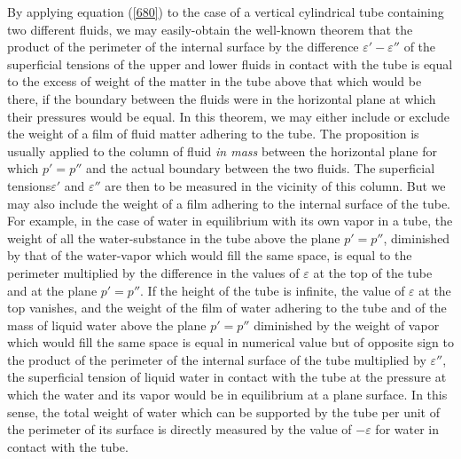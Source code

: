 \documentclass[12pt]{article}
\begin{document}
By applying equation (\ref{680}) to the case of a vertical cylindrical tube containing two different fluids, we may easily-obtain the well-known theorem that the product of the perimeter of the internal surface by the difference $\varepsilon' - \varepsilon''$ of the superficial tensions of the upper and lower fluids in contact with the tube is equal to the excess of weight of the matter in the tube above that which would be there, if the boundary between the fluids were in the horizontal plane at which their pressures would be equal. In this theorem, we may either include or exclude the weight of a film of fluid matter adhering to the tube. The proposition is usually applied to the column of fluid \textit{in mass} between the horizontal plane for which $p '=p''$ and the actual boundary between the two fluids. The superficial tensions$\varepsilon'$ and $\varepsilon''$ are then to be measured in the vicinity of this column. But we may also include the weight of a film adhering to the internal surface of the tube. For example, in the case of water in equilibrium with its own vapor in a tube, the weight of all the water-substance in the tube above the plane $p' =p''$, diminished by that of the water-vapor which would fill the same space, is equal to the perimeter multiplied by the difference in the values of $\varepsilon$ at the top of the tube and at the plane $p' =p''$. If the height of the tube is infinite, the value of $\varepsilon$ at the top vanishes, and the weight of the film of water adhering to the tube and of the mass of liquid water above the plane $p' =p''$ diminished by the weight of vapor which would fill the same space is equal in numerical value but of opposite sign to the product of the perimeter of the internal surface of the tube multiplied by $\varepsilon''$, the superficial tension of liquid water in contact with the tube at the pressure at which the water and its vapor would be in equilibrium at a plane surface. In this sense, the total weight of water which can be supported by the tube per unit of the perimeter of its surface is directly measured by the value of $-\varepsilon$ for water in contact with the tube.
\end{document}
